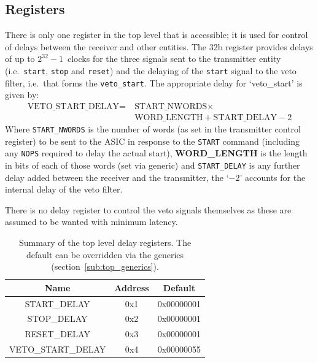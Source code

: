 \subsection{Registers} %
\label{sub:top_registers}
There is only one register in the top level that is accessible; it is used for control of delays between the receiver and other entities. The 32b register provides delays of up to \( 2^{32} - 1 \)~clocks for the three signals sent to the transmitter entity (i.e.\ \texttt{start}, \texttt{stop} and \texttt{reset}) and the delaying of the \texttt{start} signal to the veto filter, i.e.\ that forms the \texttt{veto\_start}. The appropriate delay for `veto\_start' is given by:
\begin{equation}\label{equ:veto_start_delay}
  \begin{split}
  \text{VETO\_START\_DELAY} =&~\text{START\_NWORDS} \times                   \\
                             &~\text{WORD\_LENGTH} + \text{START\_DELAY} - 2  
  \end{split}
\end{equation}
Where \texttt{START\_NWORDS} is the number of words (as set in the transmitter control register) to be sent to the ASIC in response to the \texttt{START} command (including any \texttt{NOPS} required to delay the actual start), \textbf{WORD\_LENGTH} is the length in bits of each of those words (set via generic) and \texttt{START\_DELAY} is any further delay added between the receiver and the transmitter, the `\(- 2\)' accounts for the internal delay of the veto filter. 
    
There is no delay register to control the veto signals themselves as these are assumed to be wanted with minimum latency.
    
\begin{table}[htbp]
  \begin{center}
    \begin{tabular}{c | c | c }
      Name               & Address & Default    \\
      \hline
      START\_DELAY       & 0x1     & 0x00000001 \\
      STOP\_DELAY        & 0x2     & 0x00000001 \\
      RESET\_DELAY       & 0x3     & 0x00000001 \\
      VETO\_START\_DELAY & 0x4     & 0x00000055 \\
    \end{tabular}
  \end{center}
  \caption{Summary of the top level delay registers. The default can be overridden via the generics (section~\ref{sub:top_generics}).}
  \label{tab:delay_regs}
\end{table}

